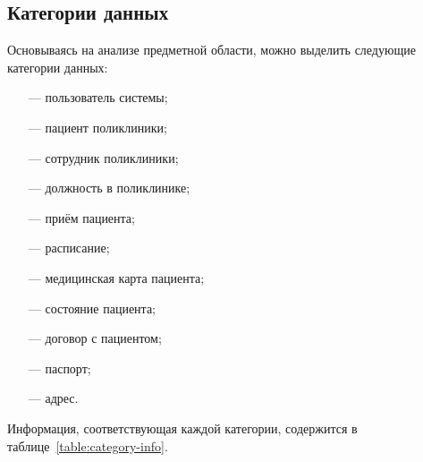 \subsection{Категории данных}

Основываясь на анализе предметной области, можно выделить следующие категории данных:
\begin{itemize}[leftmargin=1.6\parindent]
	\item[---] пользователь системы;
	\item[---] пациент поликлиники;
	\item[---] сотрудник поликлиники;
	\item[---] должность в поликлинике;
	\item[---] приём пациента;
	\item[---] расписание;
	\item[---] медицинская карта пациента;
	\item[---] состояние пациента;
	\item[---] договор с пациентом;
	\item[---] паспорт;
	\item[---] адрес.
\end{itemize}

Информация, соответствующая каждой категории, содержится в таблице~\ref{table:category-info}.

\clearpage

